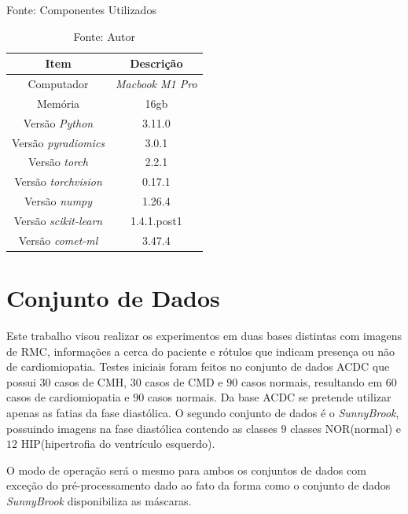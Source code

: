 \begin{table}[hbtp]
    \caption{Fonte: Componentes Utilizados}
    \centering
    \renewcommand{\arraystretch}{1} %
    \begin{tabular}{|c|c|}
    \hline 
       \textbf{Item} & \textbf{Descrição}\\
    \hline 
       Computador & \textit{Macbook M1 Pro}  \\
    \hline 
       Memória & 16gb  \\
    \hline 
       Versão \textit{Python} & 3.11.0  \\
    \hline 
       Versão \textit{pyradiomics} & 3.0.1 \\
    \hline 
       Versão \textit{torch} & 2.2.1 \\
    \hline 
       Versão \textit{torchvision} & 0.17.1 \\
    \hline 
       Versão \textit{numpy} & 1.26.4 \\
    \hline 
       Versão \textit{scikit-learn} & 1.4.1.post1 \\
    \hline 
       Versão \textit{comet-ml} & 3.47.4 \\
    \hline 
    \end{tabular} 
    \caption*{Fonte: Autor}
    \label{tab:hardware_software}
\end{table}

\section{Conjunto de Dados} 
\label{subsec:cap5_dataset}

Este trabalho visou realizar os experimentos em duas bases distintas com imagens de \gls{RMC}, informações a cerca do paciente e rótulos que indicam presença ou não de cardiomiopatia. Testes iniciais foram feitos no conjunto de dados \gls{ACDC} que possui $30$ casos de \gls{CMH}, $30$ casos de \gls{CMD} e $90$ casos normais, resultando em $60$ casos de cardiomiopatia e $90$ casos normais. Da base \gls{ACDC} se pretende utilizar apenas as fatias da fase diastólica. O segundo conjunto de dados é o \textit{SunnyBrook}, possuindo imagens na fase diastólica contendo as classes $9$ classes NOR(normal) e $12$ HIP(hipertrofia do ventrículo esquerdo).

O modo de operação será o mesmo para ambos os conjuntos de dados com exceção do pré-processamento dado ao fato da forma como o conjunto de dados \textit{SunnyBrook} disponibiliza as máscaras.

